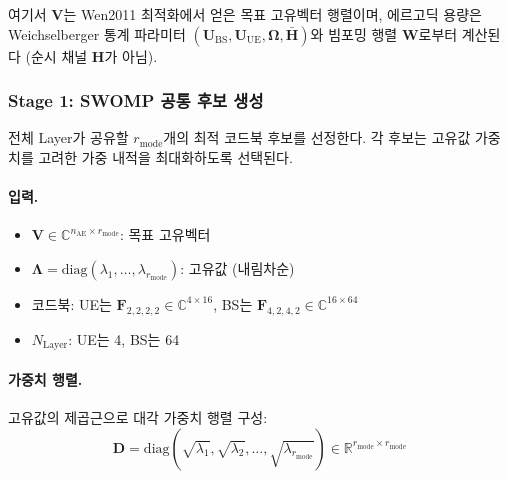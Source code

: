 \documentclass[10pt]{article}
\begin{document}
여기서 $\mathbf{V}$는 Wen2011 최적화에서 얻은 목표 고유벡터 행렬이며, 에르고딕 용량은 Weichselberger 통계 파라미터 $(\mathbf{U}_{\text{BS}}, \mathbf{U}_{\text{UE}}, \boldsymbol{\Omega}, \bar{\mathbf{H}})$와 빔포밍 행렬 $\mathbf{W}$로부터 계산된다 (순시 채널 $\mathbf{H}$가 아님).

\subsubsection{Stage 1: SWOMP 공통 후보 생성}

전체 Layer가 공유할 $r_{\text{mode}}$개의 최적 코드북 후보를 선정한다. 각 후보는 고유값 가중치를 고려한 가중 내적을 최대화하도록 선택된다.

\paragraph{입력.}
\begin{itemize}
    \item $\mathbf{V} \in \mathbb{C}^{n_{\text{AE}} \times r_{\text{mode}}}$: 목표 고유벡터
    \item $\boldsymbol{\Lambda} = \text{diag}(\lambda_1, \ldots, \lambda_{r_{\text{mode}}})$: 고유값 (내림차순)
    \item 코드북: UE는 $\mathbf{F}_{2,2,2,2} \in \mathbb{C}^{4 \times 16}$, BS는 $\mathbf{F}_{4,2,4,2} \in \mathbb{C}^{16 \times 64}$
    \item $N_{\text{Layer}}$: UE는 4, BS는 64
\end{itemize}

\paragraph{가중치 행렬.}
고유값의 제곱근으로 대각 가중치 행렬 구성:
\begin{equation}
\mathbf{D} = \text{diag}(\sqrt{\lambda_1}, \sqrt{\lambda_2}, \ldots, \sqrt{\lambda_{r_{\text{mode}}}}) \in \mathbb{R}^{r_{\text{mode}} \times r_{\text{mode}}}
\end{equation}
\end{document}
